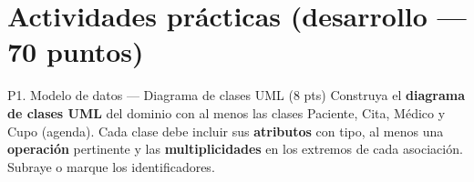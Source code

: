 \documentclass[11pt,a4paper,oneside]{article}
\begin{document}
\section{Actividades pr\'acticas (desarrollo --- 70 puntos)}

\begin{tarea}{P1. Modelo de datos --- Diagrama de clases UML \hfill (8 pts)}
Construya el \textbf{diagrama de clases UML} del dominio con al menos las clases \textsf{Paciente}, \textsf{Cita}, \textsf{M\'edico} y \textsf{Cupo} (agenda). Cada clase debe incluir sus \textbf{atributos} con tipo, al menos una \textbf{operaci\'on} pertinente y las \textbf{multiplicidades} en los extremos de cada asociaci\'on. Subraye o marque los identificadores.
\end{tarea}
\end{document}
